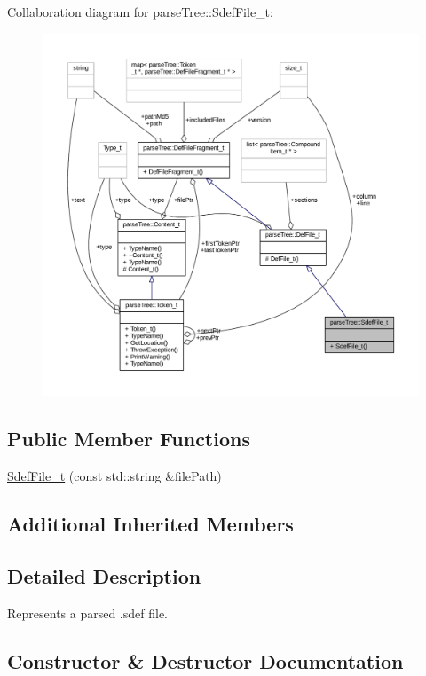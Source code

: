 Collaboration diagram for parse\+Tree\+:\+:Sdef\+File\+\_\+t\+:
\nopagebreak
\begin{figure}[H]
\begin{center}
\leavevmode
\includegraphics[width=350pt]{structparse_tree_1_1_sdef_file__t__coll__graph}
\end{center}
\end{figure}
\subsection*{Public Member Functions}
\begin{DoxyCompactItemize}
\item 
\hyperlink{structparse_tree_1_1_sdef_file__t_adbb838562e0856a019c4f58f57ad1ce3}{Sdef\+File\+\_\+t} (const std\+::string \&file\+Path)
\end{DoxyCompactItemize}
\subsection*{Additional Inherited Members}


\subsection{Detailed Description}
Represents a parsed .sdef file. 

\subsection{Constructor \& Destructor Documentation}
